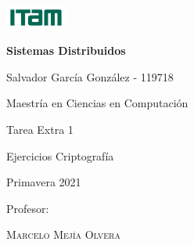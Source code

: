\documentclass[oneside]{report}
\begin{document}
\begin{titlepage}
	\centering
	\includegraphics[width=0.15\textwidth]{imgs/logo-ITAM.png}
	    \par\vspace{2cm}
	{\huge\bfseries Sistemas Distribuidos\par}
	    \vspace{1cm}
	    
	{\Large Salvador García González - 119718\par}
	{Maestría en Ciencias en Computación\par}
	\vspace{0.5cm}
		
	{\Large Tarea Extra 1\par}
	    \vspace{0.5cm}
	{\Large Ejercicios Criptografía \par}
	    \vspace{1cm}
	{\Large Primavera 2021\par}
	    \vfill
	Profesor:\par
	    \textsc{Marcelo Mejía Olvera}
	    \vfill
\end{titlepage}


%
%
\end{document}
